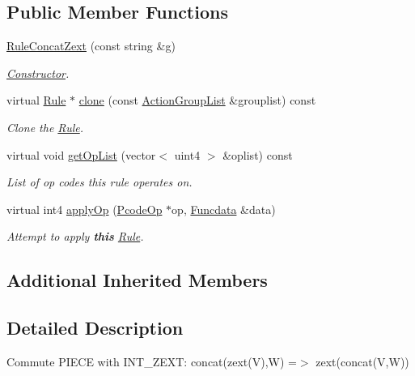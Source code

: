 \subsection*{Public Member Functions}
\begin{DoxyCompactItemize}
\item 
\mbox{\hyperlink{class_rule_concat_zext_a8fd5a5c05631f85a6d518f5cb25a2cd0}{Rule\+Concat\+Zext}} (const string \&g)
\begin{DoxyCompactList}\small\item\em \mbox{\hyperlink{class_constructor}{Constructor}}. \end{DoxyCompactList}\item 
virtual \mbox{\hyperlink{class_rule}{Rule}} $\ast$ \mbox{\hyperlink{class_rule_concat_zext_a0226be4927a0d964699fb17ba49804af}{clone}} (const \mbox{\hyperlink{class_action_group_list}{Action\+Group\+List}} \&grouplist) const
\begin{DoxyCompactList}\small\item\em Clone the \mbox{\hyperlink{class_rule}{Rule}}. \end{DoxyCompactList}\item 
virtual void \mbox{\hyperlink{class_rule_concat_zext_afb47ec17657319ca0a325574c4552413}{get\+Op\+List}} (vector$<$ uint4 $>$ \&oplist) const
\begin{DoxyCompactList}\small\item\em List of op codes this rule operates on. \end{DoxyCompactList}\item 
virtual int4 \mbox{\hyperlink{class_rule_concat_zext_aa7e8b70ac971efc988253c8b42e080b7}{apply\+Op}} (\mbox{\hyperlink{class_pcode_op}{Pcode\+Op}} $\ast$op, \mbox{\hyperlink{class_funcdata}{Funcdata}} \&data)
\begin{DoxyCompactList}\small\item\em Attempt to apply {\bfseries{this}} \mbox{\hyperlink{class_rule}{Rule}}. \end{DoxyCompactList}\end{DoxyCompactItemize}
\subsection*{Additional Inherited Members}


\subsection{Detailed Description}
Commute P\+I\+E\+CE with I\+N\+T\+\_\+\+Z\+E\+XT\+: {\ttfamily concat(zext(\+V),\+W) =$>$ zext(concat(\+V,\+W))} 

